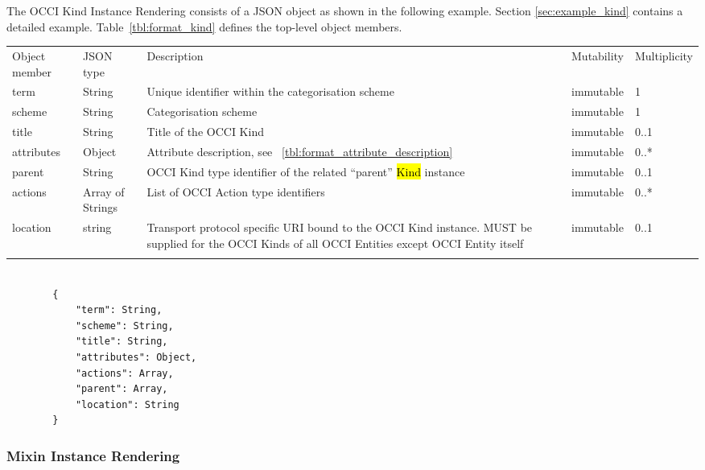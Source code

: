 \documentclass[10pt,a4paper]{article}
\begin{document}
The OCCI Kind Instance Rendering consists of a JSON object as shown in the
following example. Section \ref{sec:example_kind} contains a detailed example.
Table~\ref{tbl:format_kind} defines the top-level object members.

 {
    \begin{tabularx}{\textwidth}{llXll}
    \toprule
    Object member & JSON type & Description & Mutability & Multiplicity \\
    \colrule
    term & String & Unique identifier within the categorisation scheme &
immutable & 1 \\

    scheme & String & Categorisation scheme & immutable & 1 \\

    title & String & Title of the OCCI Kind & immutable & 0..1 \\

    attributes & Object & Attribute description, see
~\ref{tbl:format_attribute_description} & immutable & 0..* \\

    parent & String & OCCI Kind type identifier of the
related ``parent'' \hl{Kind} instance & immutable & 0..1 \\

    actions & Array of Strings & List of OCCI Action type
identifiers & immutable & 0..* \\

    location & string & Transport protocol specific URI bound to the OCCI Kind
instance. MUST be supplied for the OCCI Kinds of all OCCI Entities except OCCI
Entity itself & immutable & 0..1 \\
    \botrule
    \end{tabularx}
}

\begin{lstlisting}

        {
            "term": String,
            "scheme": String,
            "title": String,
            "attributes": Object,
            "actions": Array,
            "parent": Array,
            "location": String
        }

\end{lstlisting}

\subsubsection{Mixin Instance Rendering}
\label{sec:format_mixin}
\end{document}
